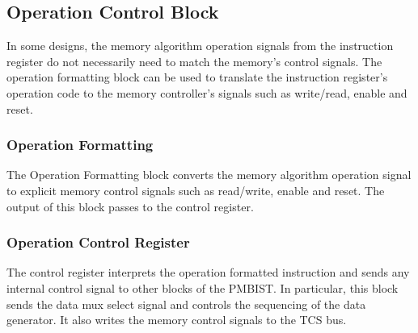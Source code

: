 \subsection{Operation Control Block}
\label{sect:bg-blocks-operation-control-block}
In some designs, the memory algorithm operation signals from the instruction register do not necessarily need to match the memory's control signals.  The operation formatting block can be used to translate the instruction register's operation code to the memory controller's signals such as write/read, enable and reset.

\subsubsection{Operation Formatting}
The Operation Formatting block converts the memory algorithm operation signal to explicit memory control signals such as read/write, enable and reset.  The output of this block passes to the control register.

\subsubsection{Operation Control Register}
The control register interprets the operation formatted instruction and sends any internal control signal to other blocks of the PMBIST.  In particular, this block sends the data mux select signal and controls the sequencing of the data generator.  It also writes the memory control signals to the TCS bus.  



